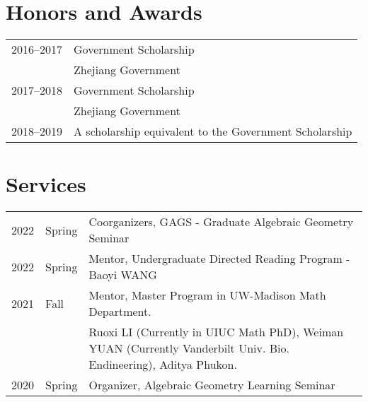 \documentclass[margin,line,pifont,palatino,courier]{res}
\begin{document}
\begin{resume}






\section{\sc Honors and Awards}

\begin{tabular}{@{}p{0.8in}p{4in}}
2016--2017 & Government Scholarship\\
           & Zhejiang Government  \\
           
2017--2018 & Government Scholarship\\
           & Zhejiang Government  \\

2018--2019 & A scholarship equivalent to the Government Scholarship\\
\end{tabular}


\bigskip



\section{\sc Services}

\begin{tabular}{@{}p{0.4in}p{0.3in}p{4in}}
    2022 & Spring & Coorganizers, GAGS - Graduate Algebraic Geometry Seminar \\

    2022 & Spring & Mentor, Undergraduate Directed Reading Program - Baoyi WANG\\
    
    2021 & Fall & Mentor, Master Program in UW-Madison Math Department.\\
    
         &      & Ruoxi LI (Currently in UIUC Math PhD), Weiman YUAN (Currently Vanderbilt Univ. Bio. Endineering), Aditya Phukon. \\


	2020 & Spring & Organizer, Algebraic Geometry Learning Seminar\\
	

\end{tabular}
\end{resume}
\end{document}
